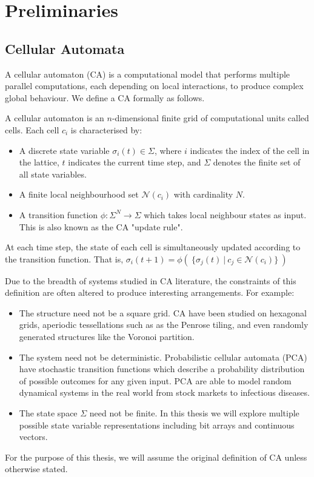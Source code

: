 \chapter{Preliminaries} \label{preliminaries}

\section{Cellular Automata}

A cellular automaton (CA) is a computational model that performs multiple parallel computations, each depending on local interactions, to produce complex global behaviour. We define a CA formally as follows.

\begin{definition}
A cellular automaton is an $n$-dimensional finite grid of computational units called cells. Each cell $c_i$ is characterised by:
\begin{itemize}
  \item A discrete state variable $\sigma_i(t) \in \Sigma$, where $i$ indicates the index of the cell in the lattice, $t$ indicates the current time step, and $\Sigma$ denotes the finite set of all state variables.
  \item A finite local neighbourhood set $\mathcal{N}(c_i)$ with cardinality $N$.
  \item A transition function $\phi:\Sigma^N \to \Sigma$ which takes local neighbour states as input. This is also known as the CA "update rule".
\end{itemize}

At each time step, the state of each cell is simultaneously updated according to the transition function. That is, $\sigma_i(t+1) = \phi( \:\{ \sigma_j(t) \: | \: c_j \in \mathcal{N}(c_i) \} \:)$
\end{definition}

Due to the breadth of systems studied in CA literature, the constraints of this definition are often altered to produce interesting arrangements. For example:
\begin{itemize}
  \item The structure need not be a square grid. CA have been studied on hexagonal grids\cite{encinas2007modelling}, aperiodic tessellations such as as the Penrose tiling\cite{goucher2012gliders}, and even randomly generated structures like the Voronoi partition\cite{shi2000development}.
  \item The system need not be deterministic. Probabilistic cellular automata (PCA) have stochastic transition functions which describe a probability distribution of possible outcomes for any given input. PCA are able to model random dynamical systems in the real world from stock markets\cite{bartolozzi2004stochastic} to infectious diseases\cite{mikler2005modeling}.
  \item The state space $\Sigma$ need not be finite. In this thesis we will explore multiple possible state variable representations including bit arrays and continuous vectors.
\end{itemize}
For the purpose of this thesis, we will assume the original definition of CA unless otherwise stated.

